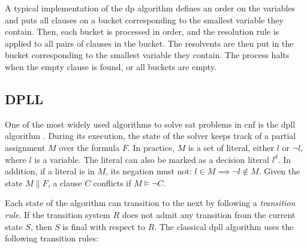A typical implementation of the \gls{dp} algorithm defines an order on the variables and puts all clauses on a bucket corresponding to the smallest variable they contain.
Then, each bucket is processed in order, and the resolution rule is applied to all pairs of clauses in the bucket.
The resolvents are then put in the bucket corresponding to the smallest variable they contain.
The process halts when the empty clause is found, or all buckets are empty.

\subsection*{DPLL}

One of the most widely used algorithms to solve \gls{sat} problems in \gls{cnf} is the \gls{dpll} algorithm \cite{paper:dpll}.
During its execution, the state of the solver keeps track of a partial assignment $M$ over the formula $F$.
In practice, $M$ is a set of literal, either $l$ or $\neg l$, where $l$ is a variable.
The literal can also be marked as a decision literal $l^d$.
In addition, if a literal is in $M$, its negation must not: $l \in M \implies \neg l \not\in M$.
Given the state $M \parallel F$, a clause $C$ conflicts if $M \models \neg C$.

Each state of the algorithm can transition to the next by following a \textit{transition rule}.
If the transition system $R$ does not admit any transition from the current state $S$, then $S$ is final with respect to $R$.
The classical \gls{dpll} algorithm uses the following transition rules:

